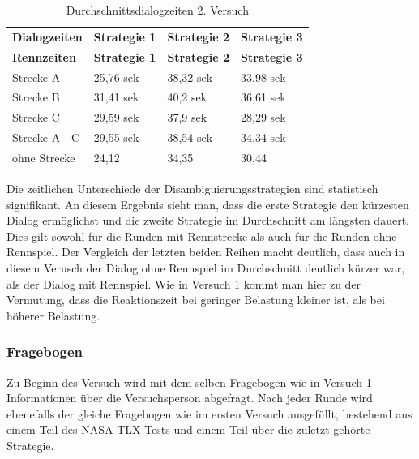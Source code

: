 \documentclass[12pt,a4paper]{scrartcl}
\begin{document}
\begin{longtable}{p{3cm}p{3cm}p{3cm}p{3cm} }
	\label{Durchschnittsdialogzeiten2}\\
	\caption[Durchschnittsdialogzeiten 2. Versuch]{Durchschnittsdialogzeiten 2. Versuch}\\
	\hline
	\textbf{Dialogzeiten}&\textbf{Strategie 1}&\textbf{Strategie 2} &\textbf{Strategie 3}\\
	\hline
	\endfirsthead
	\hline
	\textbf{Rennzeiten}&\textbf{Strategie 1}&\textbf{Strategie 2} &\textbf{Strategie 3}\\
	\hline
	\endhead
Strecke A & 25,76 sek & 38,32 sek & 33,98 sek \\
Strecke B & 31,41 sek & 40,2 sek & 36,61 sek \\
Strecke C  & 29,59 sek & 37,9 sek & 28,29 sek \\
\hline
\hline
Strecke A - C & 29,55 sek & 38,54 sek & 34,34 sek\\
\hline
ohne Strecke & 24,12 & 34,35 & 30,44 \\
\hline
\end{longtable}

Die zeitlichen Unterschiede der Disambiguierungsstrategien sind statistisch signifikant. An diesem Ergebnis sieht man, dass die erste Strategie den kürzesten Dialog ermöglichst und die zweite Strategie im Durchschnitt am längsten dauert. Dies gilt sowohl für die Runden mit Rennstrecke als auch für die Runden ohne Rennspiel. Der Vergleich der letzten beiden Reihen macht deutlich, dass auch in diesem Verusch der Dialog ohne Rennspiel im Durchschnitt deutlich kürzer war, als der Dialog mit Rennspiel. Wie in Versuch 1 kommt man hier zu der Vermutung, dass die Reaktionszeit bei geringer Belastung kleiner ist, als bei höherer Belastung.  

\subsubsection{Fragebogen}
\label{fragebogen}
Zu Beginn des Versuch wird mit dem selben Fragebogen wie in Versuch 1 Informationen über die Versuchsperson abgefragt. Nach jeder Runde wird ebenefalls der gleiche Fragebogen wie im ersten Versuch ausgefüllt, bestehend aus einem Teil des NASA-TLX Tests und einem Teil über die zuletzt gehörte Strategie.
\end{document}
